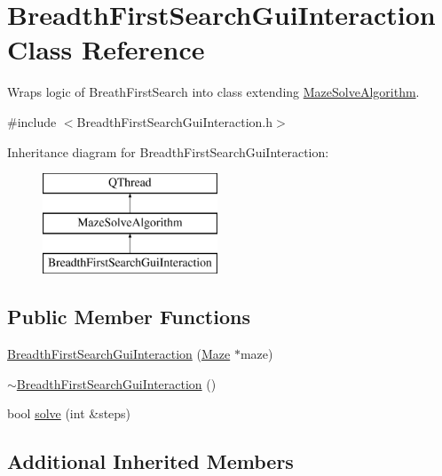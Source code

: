 \hypertarget{class_breadth_first_search_gui_interaction}{\section{Breadth\-First\-Search\-Gui\-Interaction Class Reference}
\label{class_breadth_first_search_gui_interaction}
}


Wraps logic of Breath\-First\-Search into class extending \hyperlink{class_maze_solve_algorithm}{Maze\-Solve\-Algorithm}.  




{\ttfamily \#include $<$Breadth\-First\-Search\-Gui\-Interaction.\-h$>$}

Inheritance diagram for Breadth\-First\-Search\-Gui\-Interaction\-:\begin{figure}[H]
\begin{center}
\leavevmode
\includegraphics[height=3.000000cm]{class_breadth_first_search_gui_interaction}
\end{center}
\end{figure}
\subsection*{Public Member Functions}
\begin{DoxyCompactItemize}
\item 
\hyperlink{class_breadth_first_search_gui_interaction_a32769d981f2a07be1608288bfdb96efc}{Breadth\-First\-Search\-Gui\-Interaction} (\hyperlink{class_maze}{Maze} $\ast$maze)
\item 
\hyperlink{class_breadth_first_search_gui_interaction_a0277493bfd3ce130c0e95b3d841d8f9c}{$\sim$\-Breadth\-First\-Search\-Gui\-Interaction} ()
\item 
bool \hyperlink{class_breadth_first_search_gui_interaction_ad76cbe94351cb0d25fcf5d43468074e4}{solve} (int \&steps)
\end{DoxyCompactItemize}
\subsection*{Additional Inherited Members}


